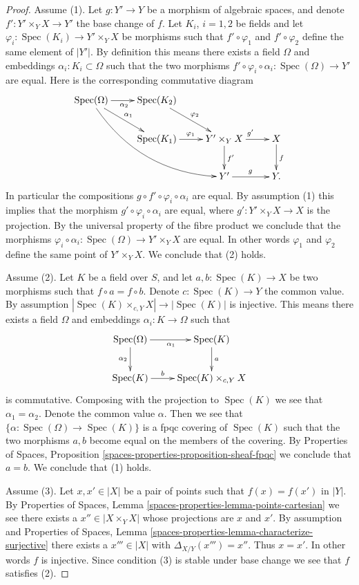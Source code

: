 \documentclass[10pt,a4paper]{amsart}
\theoremstyle{plain}
\theoremstyle{definition}
\theoremstyle{remark}
\numberwithin{equation}{subsection}
\def\Spec{\mathop{\mathrm{Spec}}}
\begin{document}
\begin{proof}
Assume (1). Let $g : Y' \to Y$ be a morphism of algebraic
spaces, and denote $f' : Y' \times_Y X \to Y'$ the base change of $f$.
Let $K_i$, $i = 1, 2$ be fields and let
$\varphi_i : \Spec(K_i) \to Y' \times_Y X$ be morphisms
such that $f' \circ \varphi_1$ and $f' \circ \varphi_2$ define the
same element of $|Y'|$. By definition this means there exists a
field $\Omega$ and embeddings $\alpha_i : K_i \subset \Omega$ such that
the two morphisms
$f' \circ \varphi_i \circ \alpha_i : \Spec(\Omega) \to Y'$ are equal.
Here is the corresponding commutative diagram
$$
\xymatrix{
\Spec(\Omega) \ar@/_5ex/[ddrr] \ar[rd]^{\alpha_1} \ar[r]_{\alpha_2} &
\Spec(K_2) \ar[rd]^{\varphi_2} \\
& \Spec(K_1) \ar[r]^{\varphi_1} &
Y' \times_Y X  \ar[d]^{f'} \ar[r]^{g'} &
 X \ar[d]^f \\
& & Y' \ar[r]^g & Y.
}
$$
In particular the compositions $g \circ f' \circ \varphi_i \circ \alpha_i$
are equal. By assumption (1) this implies that the morphism
$g' \circ \varphi_i \circ \alpha_i$ are equal, where $g' : Y' \times_Y X \to X$
is the projection. By the universal property of the fibre product we conclude
that the morphisms
$\varphi_i \circ \alpha_i : \Spec(\Omega) \to Y' \times_Y X$ are
equal. In other words $\varphi_1$ and $\varphi_2$ define the same point
of $Y' \times_Y X$. We conclude that (2) holds.

\medskip\noindent
Assume (2). Let $K$ be a field over $S$, and let $a, b : \Spec(K) \to X$
be two morphisms such that $f \circ a = f \circ b$. Denote
$c : \Spec(K) \to Y$ the common value. By assumption
$|\Spec(K) \times_{c, Y} X| \to |\Spec(K)|$ is injective.
This means there exists a field $\Omega$ and embeddings
$\alpha_i : K \to \Omega$ such that
$$
\xymatrix{
\Spec(\Omega) \ar[r]_{\alpha_1} \ar[d]_{\alpha_2} &
\Spec(K) \ar[d]^a \\
\Spec(K) \ar[r]^-b &
\Spec(K) \times_{c, Y} X
}
$$
is commutative. Composing with the projection to $\Spec(K)$
we see that $\alpha_1 = \alpha_2$. Denote the common value $\alpha$.
Then we see that $\{\alpha : \Spec(\Omega) \to \Spec(K)\}$
is a fpqc covering of $\Spec(K)$ such that the two morphisms
$a, b$ become equal on the members of the covering. By
Properties of Spaces, Proposition
\ref{spaces-properties-proposition-sheaf-fpqc}
we conclude that $a = b$. We conclude that (1) holds.

\medskip\noindent
Assume (3). Let $x, x' \in |X|$ be a pair of points such that
$f(x) = f(x')$ in $|Y|$. By
Properties of Spaces, Lemma \ref{spaces-properties-lemma-points-cartesian}
we see there exists a $x'' \in |X \times_Y X|$ whose projections
are $x$ and $x'$. By assumption and
Properties of Spaces,
Lemma \ref{spaces-properties-lemma-characterize-surjective}
there exists a $x''' \in |X|$ with $\Delta_{X/Y}(x''') = x''$.
Thus $x = x'$. In other words $f$ is injective.
Since condition (3) is stable under base change we see that $f$
satisfies (2).


\end{proof}
\end{document}
